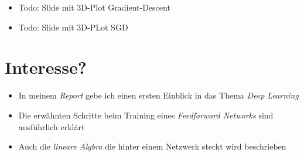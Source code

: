 \documentclass[t]{beamer}
\begin{document}
\begin{frame}
    \begin{itemize}
        \item Todo: Slide mit 3D-Plot Gradient-Descent
    \end{itemize}
\end{frame}

\begin{frame}
    \begin{itemize}
        \item Todo: Slide mit 3D-PLot SGD
    \end{itemize}
\end{frame}

\section{Interesse?}
\begin{frame}
    \begin{itemize}
        \item In meinem \emph{Report} gebe ich einen ersten Einblick in das Thema \emph{Deep Learning} \newline
        \item Die erwähnten Schritte beim Training eines \emph{Feedforward Networks} sind ausführlich erklärt \newline
        \item Auch die \emph{lineare Algbra} die hinter einem Netzwerk steckt wird beschrieben
    \end{itemize}
\end{frame}
\end{document}
